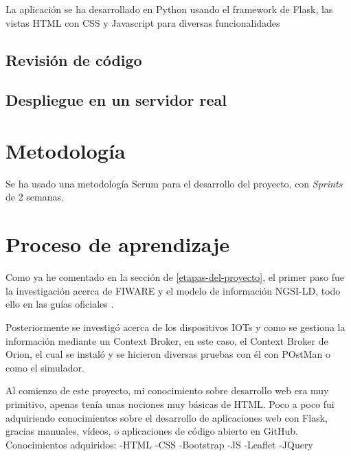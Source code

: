 La aplicación se ha desarrollado en Python usando el framework de Flask, las vistas HTML con CSS y Javascript para diversas funcionalidades 


\subsection{Revisión de código}


\subsection{Despliegue en un servidor real}



\section{Metodología}
Se ha usado una metodología Scrum para el desarrollo del proyecto, con \textit{Sprints} de 2 semanas.

\section{Proceso de aprendizaje}

Como ya he comentado en la sección de \ref{etapas-del-proyecto}, el primer paso fue la investigación acerca de FIWARE y el modelo de información NGSI-LD, todo ello en las guías oficiales \cite{fiware,fiware_ngsi_ld,etsi}. 

Posteriormente se investigó acerca de los dispositivos IOTs y como se gestiona la información mediante un Context Broker, en este caso, el Context Broker de Orion, el cual se instaló y se hicieron diversas pruebas con él con POstMan o como el simulador.

Al comienzo de este proyecto, mi conocimiento sobre desarrollo web era muy primitivo, apenas tenía unas nociones muy básicas de HTML. Poco a poco fui adquiriendo conocimientos sobre el desarrollo de aplicaciones web con Flask, gracias manuales, vídeos, o aplicaciones de código abierto en GitHub.
Conocimientos adquiridos:
-HTML
-CSS
-Bootstrap
-JS
-Leaflet
-JQuery



